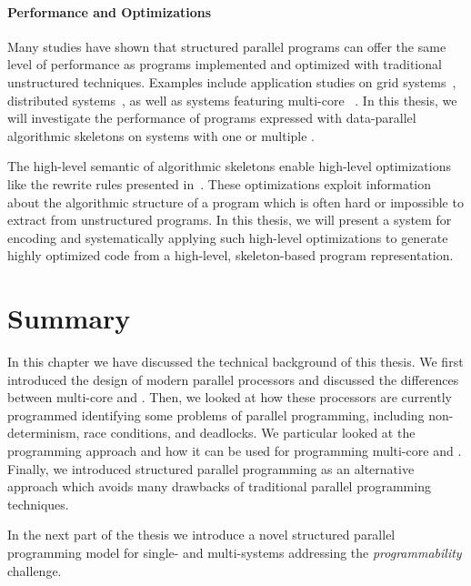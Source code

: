 \paragraph{Performance and Optimizations}
Many studies have shown that structured parallel programs can offer the same level of performance as programs implemented and optimized with traditional unstructured techniques.
Examples include application studies on grid systems~\cite{Alt2007}, distributed systems~\cite{CiechanowiczKSGK09}, as well as systems featuring multi-core \CPUs~\cite{AldinucciMT10}.
In this thesis, we will investigate the performance of programs expressed with data-parallel algorithmic skeletons on systems with one or multiple \GPUs.

The high-level semantic of algorithmic skeletons enable high-level optimizations like the rewrite rules presented in~\cite{Gorlatch00}.
These optimizations exploit information about the algorithmic structure of a program which is often hard or impossible to extract from unstructured programs.
In this thesis, we will present a system for encoding and systematically applying such high-level optimizations to generate highly optimized code from a high-level, skeleton-based program representation.


\section{Summary}
In this chapter we have discussed the technical background of this thesis.
We first introduced the design of modern parallel processors and discussed the differences between multi-core \CPUs and \GPUs.
Then, we looked at how these processors are currently programmed identifying some problems of parallel programming, including non-determinism, race conditions, and deadlocks.
We particular looked at the \OpenCL programming approach and how it can be used for programming multi-core \CPUs and \GPUs.
Finally, we introduced structured parallel programming as an alternative approach which avoids many drawbacks of traditional parallel programming techniques.

In the next part of the thesis we introduce a novel structured parallel programming model for single- and multi-\GPU systems addressing the \emph{programmability} challenge.

